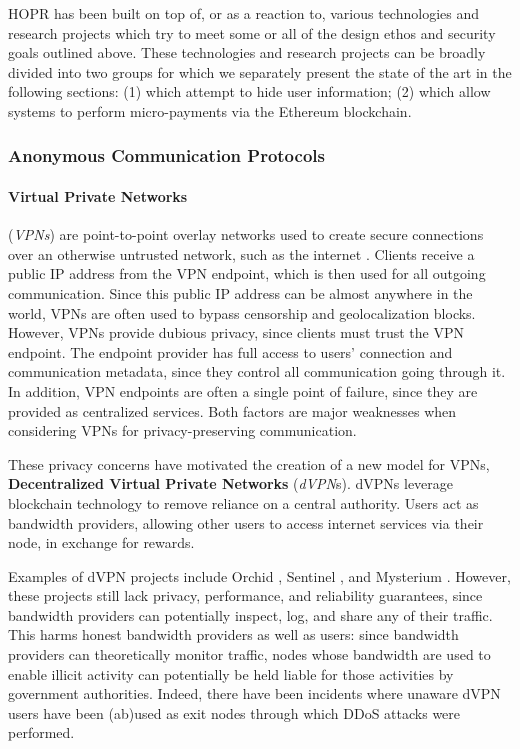 HOPR has been built on top of, or as a reaction to, various technologies and research projects which try to meet some or all of the design ethos and security goals outlined above. These technologies and research projects can be broadly divided into two groups for which we separately present the state of the art in the following sections: (1)  which attempt to hide user information; (2)  which allow systems to perform micro-payments via the Ethereum blockchain.

\subsubsection{Anonymous Communication Protocols}
\label{sec:privacyprotocols}

\paragraph{Virtual Private Networks}(\textit{VPNs}) are point-to-point overlay networks used to create secure connections over an otherwise untrusted network, such as the internet \cite{venkateswaran_2001}. Clients receive a public IP address from the VPN endpoint, which is then used for all outgoing communication. Since this public IP address can be almost anywhere in the world, VPNs are often used to bypass censorship \cite{hobbs_roberts_2018} and geolocalization blocks. However, VPNs provide dubious privacy, since clients must trust the VPN endpoint. The endpoint provider has full access to users' connection and communication metadata, since they control all communication going through it. In addition, VPN endpoints are often a single point of failure, since they are provided as centralized services. Both factors are major weaknesses when considering VPNs for privacy-preserving communication.

These privacy concerns have motivated the creation of a new model for VPNs, \textbf{Decentralized Virtual Private Networks} (\textit{dVPN}s). dVPNs leverage blockchain technology to remove reliance on a central authority. Users act as bandwidth providers, allowing other users to access internet services via their node, in exchange for rewards.

Examples of dVPN projects include Orchid \cite{orchid}, Sentinel \cite{sentinel}, and Mysterium \cite{mysterium}. However, these projects still lack privacy, performance, and reliability guarantees, since bandwidth providers can potentially inspect, log, and share any of their traffic. This harms honest bandwidth providers as well as users: since bandwidth providers can theoretically monitor traffic, nodes whose bandwidth are used to enable illicit activity can potentially be held liable for those activities by government authorities. Indeed, there have been incidents where unaware dVPN users have been (ab)used as exit nodes through which DDoS attacks
were performed.

